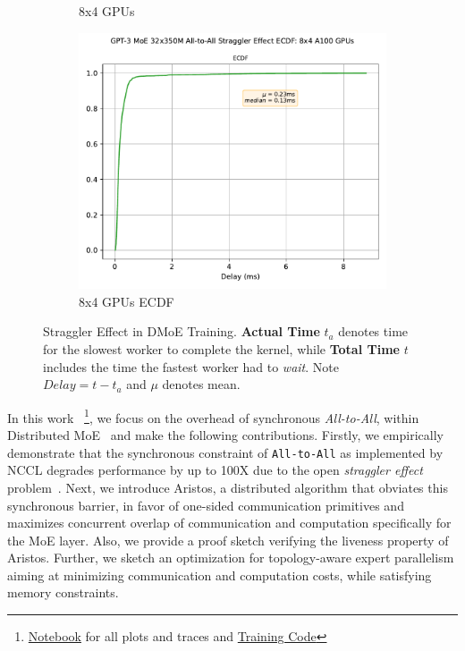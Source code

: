 \begin{figure}[!ht]
\begin{subfigure}{.5\linewidth}
        \caption{8x4 GPUs}
        \label{sub:m_350}
    \end{subfigure}\hfill %
    \begin{subfigure}{.5\linewidth}
        \centering
        \includegraphics[width=0.6\linewidth, keepaspectratio]{images/GPT-3_MoE_32x350M_ecdf}
        \caption{8x4 GPUs ECDF}
        \label{sub:m_350_ecdf}
    \end{subfigure}
    \caption{\footnotesize Straggler Effect in DMoE Training.
    \textbf{Actual Time} $t_a$ denotes time for the slowest worker to complete the kernel,
        while \textbf{Total Time} $t$ includes the time the fastest worker had to \emph{wait}.
        Note $Delay = t - t_a$ and $\mu$ denotes mean.}
    \label{fig:straggler}
\end{figure}
In this work
~\footnote{\href{https://github.com/osayamenja/DataCruncher}{Notebook} for all plots and traces and
\href{https://github.com/osayamenja/Megatron-DeepSpeed}{Training Code}},
we focus on the overhead of synchronous \emph{All-to-All},
within Distributed MoE~\cite{DBLP:journals/corr/abs-2006-16668}
and make the following contributions.
Firstly, we empirically demonstrate that the synchronous constraint of \verb|All-to-All|
as implemented by NCCL degrades performance by up to 100X due to
the open \emph{straggler effect} problem~\cite{10.1145/2987550.2987554}.
Next, we introduce Aristos, a distributed algorithm
that obviates this synchronous barrier, in favor of one-sided communication primitives and maximizes
concurrent overlap of communication and computation specifically for the MoE layer.
Also, we provide a proof sketch verifying the liveness property of Aristos.
Further, we sketch an optimization for topology-aware expert parallelism
aiming at minimizing communication and computation costs,
while satisfying memory constraints.
   
